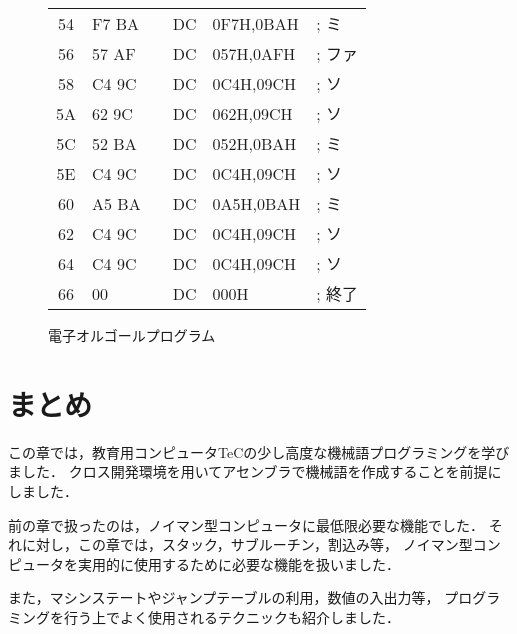 \begin{figure}[btp]
{\begin{center}
\begin{tabular}{|c|l|l|l l l|}
54 & F7 BA        &         & DC     & 0F7H,0BAH   &   ; ミ\\
56 & 57 AF        &         & DC     & 057H,0AFH   &   ; ファ\\
58 & C4 9C        &         & DC     & 0C4H,09CH   &   ; ソ\\
5A & 62 9C        &         & DC     & 062H,09CH   &   ; ソ\\
5C & 52 BA        &         & DC     & 052H,0BAH   &   ; ミ\\
5E & C4 9C        &         & DC     & 0C4H,09CH   &   ; ソ\\
60 & A5 BA        &         & DC     & 0A5H,0BAH   &   ; ミ\\
62 & C4 9C        &         & DC     & 0C4H,09CH   &   ; ソ\\
64 & C4 9C        &         & DC     & 0C4H,09CH   &   ; ソ\\
66 & 00           &         & DC     & 000H        &   ; 終了\\
\hline
\end{tabular}
\end{center}}
\caption{電子オルゴールプログラム}
\label{fig:chap6:doremi}
\end{figure}

\newpage
\section{まとめ}

この章では，教育用コンピュータTeCの少し高度な機械語プログラミングを学びました．
クロス開発環境を用いてアセンブラで機械語を作成することを前提にしました．

前の章で扱ったのは，ノイマン型コンピュータに最低限必要な機能でした．
それに対し，この章では，スタック，サブルーチン，割込み等，
ノイマン型コンピュータを実用的に使用するために必要な機能を扱いました．

また，マシンステートやジャンプテーブルの利用，数値の入出力等，
プログラミングを行う上でよく使用されるテクニックも紹介しました．
